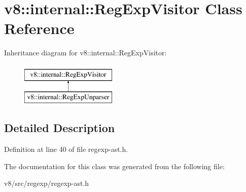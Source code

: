 \hypertarget{classv8_1_1internal_1_1RegExpVisitor}{}\section{v8\+:\+:internal\+:\+:Reg\+Exp\+Visitor Class Reference}
\label{classv8_1_1internal_1_1RegExpVisitor}
Inheritance diagram for v8\+:\+:internal\+:\+:Reg\+Exp\+Visitor\+:\begin{figure}[H]
\begin{center}
\leavevmode
\includegraphics[height=2.000000cm]{classv8_1_1internal_1_1RegExpVisitor}
\end{center}
\end{figure}


\subsection{Detailed Description}


Definition at line 40 of file regexp-\/ast.\+h.



The documentation for this class was generated from the following file\+:\begin{DoxyCompactItemize}
\item 
v8/src/regexp/regexp-\/ast.\+h\end{DoxyCompactItemize}
